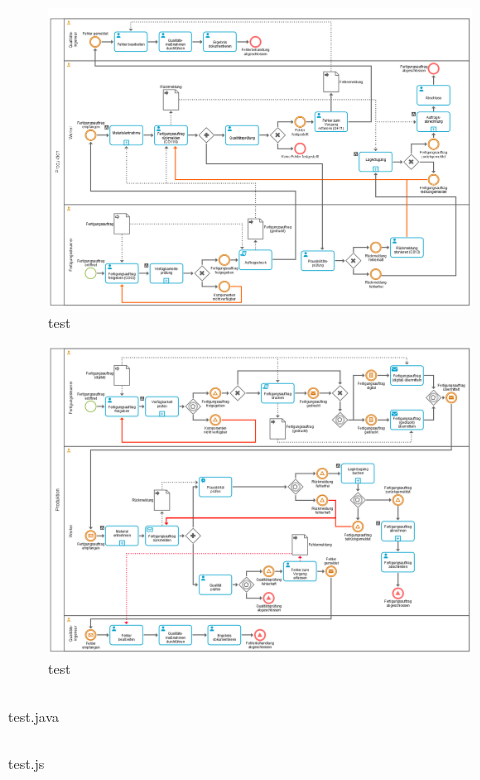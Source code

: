 \begin{figure}[H]
	\centering 
	\includegraphics[angle=270,width=\textwidth]{img/Order_Operating_IST.png}	\caption[TEST]{\label{fig:logo}test
	}
\end{figure}

\begin{figure}[H]
	\centering 
	\includegraphics[angle=270,width=\textwidth]{img/Order_Operating_SOLL.png}	\caption[TEST]{\label{fig:logo}test
	}
\end{figure}

\begin{algorithm}[H]
\centering 
\inputminted[linenos]{java}{code/test.java}
\caption{test.java}
\end{algorithm}

\begin{algorithm}[H]
\centering 
% 
\inputminted[linenos]{js}{code/test.js}
\caption{test.js}
\end{algorithm}

